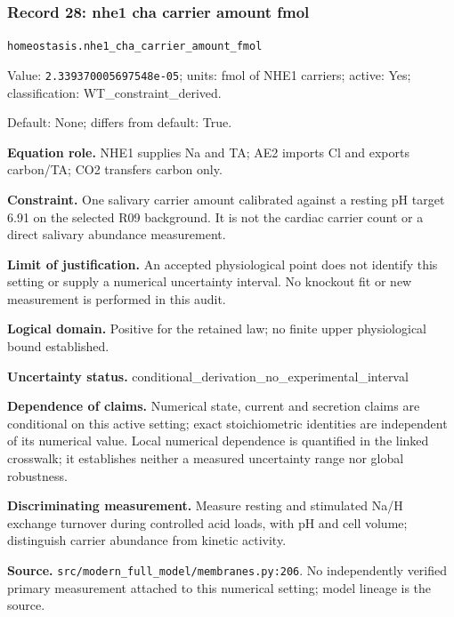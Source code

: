 \subsubsection*{Record 28: nhe1 cha carrier amount fmol}
{\small \nolinkurl{homeostasis.nhe1_cha_carrier_amount_fmol}\par

Value: \texttt{2.339370005697548e-05}; units: fmol of NHE1 carriers; active: Yes; classification: WT\_constraint\_derived.\par

Default: None; differs from default: True.\par

\textbf{Equation role.} NHE1 supplies Na and TA; AE2 imports Cl and exports carbon/TA; CO2 transfers carbon only.\par

\textbf{Constraint.} One salivary carrier amount calibrated against a resting pH target 6.91 on the selected R09 background. It is not the cardiac carrier count or a direct salivary abundance measurement.\par

\textbf{Limit of justification.} An accepted physiological point does not identify this setting or supply a numerical uncertainty interval. No knockout fit or new measurement is performed in this audit.\par

\textbf{Logical domain.} Positive for the retained law; no finite upper physiological bound established.\par

\textbf{Uncertainty status.} conditional\_derivation\_no\_experimental\_interval\par

\textbf{Dependence of claims.} Numerical state, current and secretion claims are conditional on this active setting; exact stoichiometric identities are independent of its numerical value. Local numerical dependence is quantified in the linked crosswalk; it establishes neither a measured uncertainty range nor global robustness.\par

\textbf{Discriminating measurement.} Measure resting and stimulated Na/H exchange turnover during controlled acid loads, with pH and cell volume; distinguish carrier abundance from kinetic activity.\par

\textbf{Source.} \nolinkurl{src/modern_full_model/membranes.py:206}. No independently verified primary measurement attached to this numerical setting; model lineage is the source.\par}

